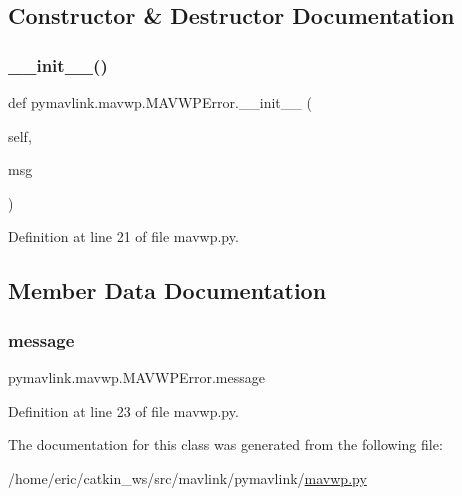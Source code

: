 \subsection{Constructor \& Destructor Documentation}
\mbox{\label{classpymavlink_1_1mavwp_1_1MAVWPError_a721056590680e02f6b73592650d6a3a3}} 
\subsubsection{\texorpdfstring{\_\_init\_\_()}{\_\_init\_\_()}}
{\footnotesize\ttfamily def pymavlink.\+mavwp.\+M\+A\+V\+W\+P\+Error.\+\_\+\+\_\+init\+\_\+\+\_\+ (\begin{DoxyParamCaption}\item[{}]{self,  }\item[{}]{msg }\end{DoxyParamCaption})}



Definition at line 21 of file mavwp.\+py.



\subsection{Member Data Documentation}
\mbox{\label{classpymavlink_1_1mavwp_1_1MAVWPError_a8697ca92000e467cae067a8464d26625}} 
\subsubsection{\texorpdfstring{message}{message}}
{\footnotesize\ttfamily pymavlink.\+mavwp.\+M\+A\+V\+W\+P\+Error.\+message}



Definition at line 23 of file mavwp.\+py.



The documentation for this class was generated from the following file\+:\begin{DoxyCompactItemize}
\item 
/home/eric/catkin\+\_\+ws/src/mavlink/pymavlink/\mbox{\hyperlink{mavwp_8py}{mavwp.\+py}}\end{DoxyCompactItemize}
